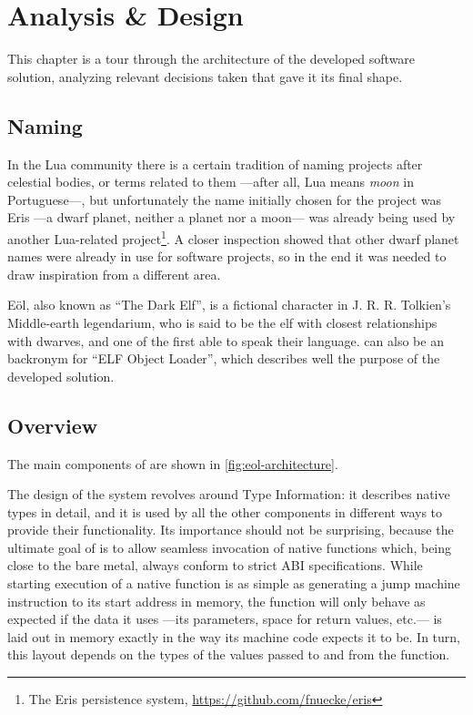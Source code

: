 
\cleardoublepage
\setchaptertoc
\chapter{Analysis \& Design}

This chapter is a tour through the architecture of the developed software
solution, analyzing relevant decisions taken that gave it its final shape.
\afterintro

\section{Naming}

In the Lua community there is a certain tradition of naming projects after
celestial bodies, or terms related to them —after all, Lua means \emph{moon}
in Portuguese—, but unfortunately the name initially chosen for the project
was Eris —a dwarf planet, neither a planet nor a moon— was already being used
by another Lua-related project\footnote{The Eris persistence system,
\url{https://github.com/fnuecke/eris}}. A closer inspection showed that other
dwarf planet names were already in use for software projects, so in the end
it was needed to draw inspiration from a different area.

Eöl, also known as “The Dark Elf”, is a fictional character in
J. R. R. Tolkien's Middle-earth legendarium, who is said to be the elf with
closest relationships with dwarves, and one of the first able to speak their
language.  \Eol* can also be an \gls{backronym} for “ELF Object Loader”,
which describes well the purpose of the developed solution.


\section{Overview}
	\label{sec:design-overview}

The main components of \Eol* are shown in \autoref{fig:eol-architecture}.

The design of the system revolves around \textsf{Type Information}: it
describes native types in detail, and it is used by all the other components
in different ways to provide their functionality. Its importance should not be
surprising, because the ultimate goal of \Eol* is to allow seamless invocation
of native functions which, being close to the bare metal, always conform to
strict \gls{ABI} specifications. While starting execution of a native function
is as simple as generating a jump machine instruction to its start address in
memory, the function will only behave as expected if the data it uses —its
parameters, space for return values, etc.— is laid out in memory exactly in
the way its machine code expects it to be. In turn, this layout depends on the
types of the values passed to and from the function.

